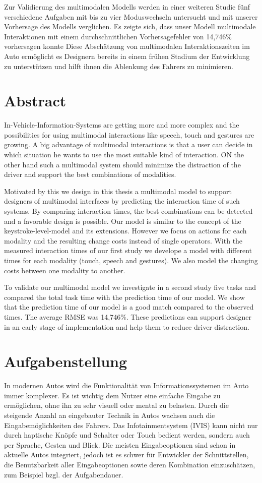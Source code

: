 \documentclass[11pt,a4paper,twoside]{book}
\begin{document}
Zur Validierung des multimodalen Modells werden in einer weiteren Studie fünf verschiedene Aufgaben mit bis zu vier Moduswechseln untersucht und mit unserer Vorhersage des Modells verglichen.
Es zeigte sich, dass unser Modell multimodale Interaktionen mit einem durchschnittlichen Vorhersagefehler von 14,746\% vorhersagen konnte
Diese Abschätzung von multimodalen Interaktionszeiten im Auto ermöglicht es Designern bereits in einem frühen Stadium der Entwicklung zu unterstützen und hilft ihnen die Ablenkung des Fahrers zu minimieren.


\chapter*{Abstract}
In-Vehicle-Information-Systems are getting more and more complex and the possibilities for using multimodal interactions like speech, touch and gestures are growing.
A big advantage of multimodal interactions is that a user can decide in which situation he wants to use the most suitable kind of interaction.
ON the other hand such a multimodal system should minimize the distraction of the driver and support the best combinations of modalities.

Motivated by this we design in this thesis a multimodal model to support designers of multimodal interfaces by predicting the interaction time of such systems.
By comparing interaction times, the best combinations can be detected and a favorable design is possible.
Our model is similar to the concept of the keystroke-level-model and its extensions.
However we focus on actions for each modality and the resulting change costs instead of single operators.
With the measured interaction times of our first study we develope a model with different times for each modality (touch, speech and gestures).
We also model the changing costs between one modality to another.

To validate our multimodal model we investigate in a second study five tasks and compared the total task time with the prediction time of our model.
We show that the prediction time of our model is a good match compared to the observed times.
The average RMSE was 14,746\%.
These predictions can support designer in an early stage of implementation and help them to reduce driver distraction.

\clearpage
\chapter*{Aufgabenstellung}
In modernen Autos wird die Funktionalität von Informationssystemen im Auto immer komplexer. Es ist wichtig dem Nutzer eine einfache Eingabe zu ermöglichen, ohne ihn zu sehr visuell oder mental zu belasten. Durch die steigende Anzahl an eingebauter Technik in Autos wachsen auch die Eingabemöglichkeiten des Fahrers. Das Infotainmentsystem (IVIS) kann nicht nur durch haptische Knöpfe und Schalter oder Touch bedient werden, sondern auch per Sprache, Gesten und Blick. Die meisten Eingabeoptionen sind schon in aktuelle Autos integriert, jedoch ist es schwer für Entwickler der Schnittstellen, die Benutzbarkeit aller Eingabeoptionen sowie deren Kombination einzuschätzen, zum Beispiel bzgl. der Aufgabendauer.
\end{document}
